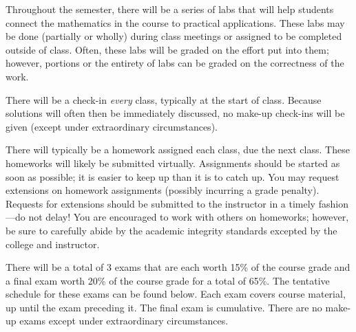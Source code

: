\documentclass[11pt,letterpaper]{article}
\begin{document}
Throughout the semester, there will be a series of labs that will help students connect the mathematics in the course to practical applications. These labs may be done (partially or wholly) during class meetings or assigned to be completed outside of class. Often, these labs will be graded on the effort put into them; however, portions or the entirety of labs can be graded on the correctness of the work. \pspace


There will be a check-in \textit{every} class, typically at the start of class. Because solutions will often then be immediately discussed, no make-up check-ins will be given (except under extraordinary circumstances). \pspace


There will typically be a homework assigned each class, due the next class. These homeworks will likely be submitted virtually. Assignments should be started as soon as possible; it is easier to keep up than it is to catch up. You may request extensions on homework assignments (possibly incurring a grade penalty). Requests for extensions should be submitted to the instructor in a timely fashion---do not delay! You are encouraged to work with others on homeworks; however, be sure to carefully abide by the academic integrity standards excepted by the college and instructor. \pspace


There will be a total of 3 exams that are each worth 15\% of the course grade and a final exam worth 20\% of the course grade for a total of 65\%. The tentative schedule for these exams can be found below. Each exam covers course material, up until the exam preceding it. The final exam is cumulative. There are no make-up exams except under extraordinary circumstances. \pspace
\end{document}
